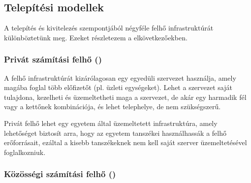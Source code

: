 
\subsection{Telepítési modellek}


A telepítés és kivitelezés szempontjából négyféle felhő infrastruktúrát különböztetünk meg\cite{nistsp800-145}. Ezeket részletezem a elkövetkezőekben.

\subsubsection{Privát számítási felhő ()}

A felhő infrastruktúrát kizárólagosan egy egyedüli szervezet használja, amely magába foglal több előfizetőt (pl. üzleti egységeket). Lehet a szervezet saját tulajdona, kezelheti és üzemeltetheti maga a szervezet, de akár egy harmadik fél vagy a kettőnek kombinációja, és lehet telephelye, de nem szükségszerű.

Privát felhő lehet egy egyetem által üzemeltetett infrastruktúra, amely lehetőséget biztosít arra, hogy az egyetem tanszékei használhassák a felhő erőforrásait, ezáltal a kisebb tanszékeknek nem kell saját szerver üzemeltetésével foglalkozniuk.

\subsubsection{Közösségi számítási felhő ()}

